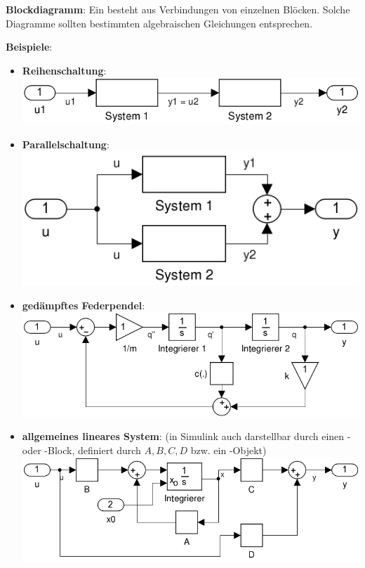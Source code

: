 \linie

\textbf{Blockdiagramm}:
Ein  besteht aus Verbindungen von einzelnen Blöcken.
Solche Diagramme sollten bestimmten algebraischen Gleichungen entsprechen.

\textbf{Beispiele}:
\begin{itemize}
    \item
    \textbf{Reihenschaltung}:\\
    \includegraphics[scale=\modelscale]{schaltung_reihe.png}
    
    \item
    \textbf{Parallelschaltung}:\\
    \includegraphics[scale=\modelscale]{schaltung_parallel.png}
    
    \item
    \textbf{gedämpftes Federpendel}:\\
    \includegraphics[scale=\modelscale]{federpendel_gedaempft.png}
    
    \item
    \textbf{allgemeines lineares System}:
    (in Simulink auch darstellbar durch einen - oder -Block,
    definiert durch $A, B, C, D$ bzw. ein -Objekt)\\
    \includegraphics[scale=\modelscale]{lineares_system.png}
\end{itemize}

\pagebreak
